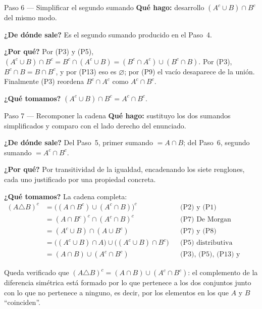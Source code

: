 \documentclass[11pt]{article}
\begin{document}
\begin{paso}{Paso 6 --- Simplificar el segundo sumando}
\textbf{Qué hago:} desarrollo $(A^{c}\cup B)\cap B^{c}$ del mismo modo.

\textbf{¿De dónde sale?} Es el segundo sumando producido en el Paso~4.

\textbf{¿Por qué?} Por (P3) y (P5), $(A^{c}\cup B)\cap B^{c}=B^{c}\cap(A^{c}\cup B)
=(B^{c}\cap A^{c})\cup(B^{c}\cap B)$. Por (P3), $B^{c}\cap B=B\cap B^{c}$, y por (P13) eso es
$\varnothing$; por (P9) el vacío desaparece de la unión. Finalmente (P3) reordena
$B^{c}\cap A^{c}$ como $A^{c}\cap B^{c}$.

\textbf{¿Qué tomamos?} $(A^{c}\cup B)\cap B^{c}=A^{c}\cap B^{c}$.
\end{paso}

\begin{paso}{Paso 7 --- Recomponer la cadena}
\textbf{Qué hago:} sustituyo los dos sumandos simplificados y comparo con el lado derecho del
enunciado.

\textbf{¿De dónde sale?} Del Paso~5, primer sumando $=A\cap B$; del Paso~6, segundo sumando
$=A^{c}\cap B^{c}$.

\textbf{¿Por qué?} Por transitividad de la igualdad, encadenando los siete renglones, cada uno
justificado por una propiedad concreta.

\textbf{¿Qué tomamos?} La cadena completa:
\begin{align*}
(A\triangle B)^{c}
&=\bigl((A\cap B^{c})\cup(A^{c}\cap B)\bigr)^{c} && \text{(P2) y (P1)}\\
&=(A\cap B^{c})^{c}\cap(A^{c}\cap B)^{c} && \text{(P7) De Morgan}\\
&=(A^{c}\cup B)\cap(A\cup B^{c}) && \text{(P7) y (P8)}\\
&=\bigl((A^{c}\cup B)\cap A\bigr)\cup\bigl((A^{c}\cup B)\cap B^{c}\bigr) && \text{(P5) distributiva}\\
&=(A\cap B)\cup(A^{c}\cap B^{c}) && \text{(P3), (P5), (P13) y (P9)}
\end{align*}
\end{paso}

\begin{resp}
Queda verificado que $(A\triangle B)^{c}=(A\cap B)\cup(A^{c}\cap B^{c})$: el complemento de la
diferencia simétrica está formado por lo que pertenece a los dos conjuntos junto con lo que no
pertenece a ninguno, es decir, por los elementos en los que $A$ y $B$ ``coinciden''.
\end{resp}

\end{document}
